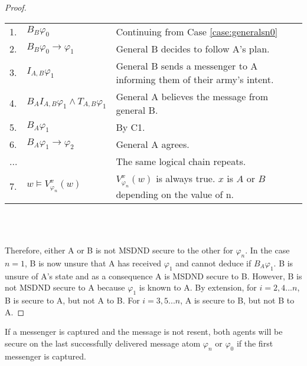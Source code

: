 \begin{proof}
\begin{table}[H]
\centering
\small
\begin{tabularx}{\linewidth}{l l X}
1. & $B_{B} \varphi_0$ & Continuing from Case \ref{case:generalsn0} \\
2. & $B_{B} \varphi_0 \rightarrow \varphi_1$ & General B decides to follow A's plan. \\
3. & $I_{A,B} \varphi_1$ & General B sends a messenger to A informing them of their army's intent. \\
4. & $B_{A}I_{A,B} \varphi_1 \wedge T_{A,B} \varphi_1$ & General A believes the message from general B. \\
5. & $B_{A}\varphi_1$ & By C1. \\
6. & $B_{A}\varphi_1 \rightarrow \varphi_2$ & General A agrees. \\
...& & The same logical chain repeats. \\
7. & $w \vDash V_{\varphi_n}^{x}(w)$ & $V_{\varphi_n}^{x}(w)$ is always true. $x$ is $A$ or $B$ depending on the value of n. %
\end{tabularx} \\~\\
\label{tab:twoarmiesproof2}
\end{table}

Therefore, either A or B is not MSDND secure to the other for $\varphi_n$.
In the case $n=1$, B is now unsure that A has received $\varphi_1$ and cannot deduce if $B_{A} \varphi_1$. B is unsure of A's state and as a consequence A is MSDND secure to B. However, B is not MSDND secure to A because $\varphi_1$ is known to A. By extension, for $i=2,4...n$, B is secure to A, but not A to B. For $i=3,5...n$, A is secure to B, but not B to A.
\end{proof}


\begin{thm}
If a messenger is captured and the message is not resent, both agents will be secure on the last successfully delivered message atom $\varphi_{n}$ or $\varphi_0$ if the first messenger is captured.
\label{thm:captured}
\end{thm}

